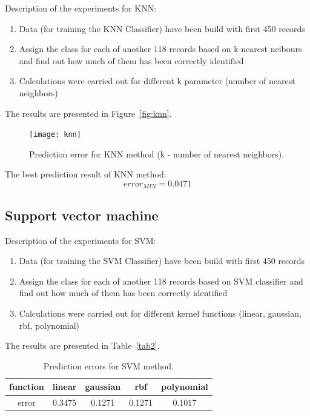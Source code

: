 \documentclass[
10pt, %
a4paper, %
oneside, %
headinclude,footinclude, %
BCOR5mm, %
]{scrartcl}
\begin{document}
Description of the experiments for KNN:
\begin{enumerate}[noitemsep] %
\item Data (for training the KNN Classifier) have been build with first 450 records
\item Assign the class for each of another 118 records based on k-nearest neibours and find out how much of them has been correctly identified
\item Calculations were carried out for different k parameter (number of nearest neighbors)
\end{enumerate}
The results are presented in Figure~\vref{fig:knn}.

\begin{figure}[H]
\centering 
\texttt{[image: knn]} 
\caption[An example of a floating figure]{Prediction error for KNN method (k - number of nearest neighbors).} %
\label{fig:knn} 
\end{figure}

The best prediction result of KNN method:
\begin{equation}
 error_{MIN} = 0.0471
\label{eq:refname2}
\end{equation}

\subsection{Support vector machine}

Description of the experiments for SVM:
\begin{enumerate}[noitemsep] %
\item Data (for training the SVM Classifier) have been build with first 450 records
\item Assign the class for each of another 118 records based on SVM classifier and find out how much of them has been correctly identified
\item Calculations were carried out for different kernel functions (linear, gaussian, rbf, polynomial)
\end{enumerate}
The results are presented in Table~\vref{tab2}.

\begin{table}[H]
	\centering
	\begin{tabular}{ c | c | c | c | c }
    function  & linear & gaussian & rbf & polynomial \\ \hline
    error & 0.3475 & 0.1271 & 0.1271 & \cellcolor{amber!25}0.1017 \\
  	\end{tabular}
  	\caption{Prediction errors for SVM method.}
  	\label{tab2}
\end{table}
\end{document}
